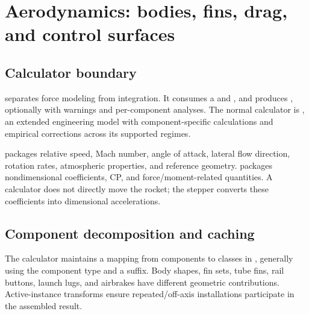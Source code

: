 \chapter{Aerodynamics: bodies, fins, drag, and control surfaces}\label{ch:aero}
\section{Calculator boundary}
 separates force modeling from integration. It consumes a  and , and produces , optionally with warnings and per-component analyses. The normal calculator is , an extended engineering model with component-specific calculations and empirical corrections across its supported regimes.

 packages relative speed, Mach number, angle of attack, lateral flow direction, rotation rates, atmospheric properties, and reference geometry.  packages nondimensional coefficients, CP, and force/moment-related quantities. A calculator does not directly move the rocket; the stepper converts these coefficients into dimensional accelerations.


\section{Component decomposition and caching}
The calculator maintains a mapping from components to classes in , generally using the component type and a  suffix. Body shapes, fin sets, tube fins, rail buttons, launch lugs, and airbrakes have different geometric contributions. Active-instance transforms ensure repeated/off-axis installations participate in the assembled result.

